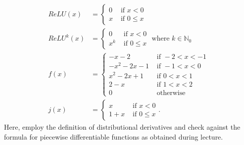 \documentclass[11pt]{article}
\begin{document}




\begin{exercise}
    \begin{align*}
        ReLU(x) 
        &= \begin{cases} 0 & \text{ if } x < 0 \\ x & \text{ if } 0 \leq x \end{cases}
        \\
        ReLU^{k}(x) 
        &= \begin{cases} 0 & \text{ if } x < 0 \\ x^{k} & \text{ if } 0 \leq x \end{cases} \text{ where } k \in \mathbb N_0
        \\
        f(x) 
        &= 
        \begin{cases} 
            -x-2            & \text{ if } -2 < x < -1
            \\
            - x^{2} - 2x - 1 & \text{ if } -1 < x < 0 
            \\ 
              x^{2} - 2x + 1 & \text{ if } 0 <  x < 1
            \\
            2-x            & \text{ if }  1 < x < 2
            \\
            0              & \text{ otherwise }  
        \end{cases}
        \\
        j(x) 
        &= 
        \begin{cases} 
            x      & \text{ if } x < 0
            \\
            1 + x  & \text{ if } 0 \leq x             
        \end{cases}
        .
    \end{align*}
    Here, employ the definition of distributional derivatives and check against the formula for piecewise differentiable functions as obtained during lecture. 
\end{exercise}
\end{document}

